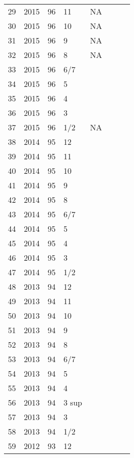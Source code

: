 \begin{longtable}{ |l|l|l|l|l|l|l|l| }
 29 & 2015 & 96 &    11 &      NA &  &  & \\
 30 & 2015 & 96 &    10 &      NA &  &  & \\
 31 & 2015 & 96 &     9 &      NA &  &  & \\
 32 & 2015 & 96 &     8 &      NA &  &  & \\
 33 & 2015 & 96 &   6/7 &         &  &  & \\
 34 & 2015 & 96 &     5 &         &  &  & \\
 35 & 2015 & 96 &     4 &         &  &  & \\
 36 & 2015 & 96 &     3 &         &  &  & \\
 37 & 2015 & 96 &   1/2 &      NA &  &  & \\
 38 & 2014 & 95 &    12 &         &  &  & \\
 39 & 2014 & 95 &    11 &         &  &  & \\
 40 & 2014 & 95 &    10 &         &  &  & \\
 41 & 2014 & 95 &     9 &         &  &  & \\
 42 & 2014 & 95 &     8 &         &  &  & \\
 43 & 2014 & 95 &   6/7 &         &  &  & \\
 44 & 2014 & 95 &     5 &         &  &  & \\
 45 & 2014 & 95 &     4 &         &  &  & \\
 46 & 2014 & 95 &     3 &         &  &  & \\
 47 & 2014 & 95 &   1/2 &         &  &  & \\
 48 & 2013 & 94 &    12 &         &  &   & \\
 49 & 2013 & 94 &    11 &         &  &  & \\
 50 & 2013 & 94 &    10 &         &  &  & \\
 51 & 2013 & 94 &     9 &         &  &  & \\
 52 & 2013 & 94 &     8 &         &  &  & \\
 53 & 2013 & 94 &   6/7 &         &  &  & \\
 54 & 2013 & 94 &     5 &         &  &  & \\
 55 & 2013 & 94 &     4 &         &  &  & \\
 56 & 2013 & 94 & 3 sup &         &  &  & \\
 57 & 2013 & 94 &     3 &         &  &  & \\
 58 & 2013 & 94 &   1/2 &         &  &  & \\
 59 & 2012 & 93 &    12 &         &  &  & \\

\end{longtable}
